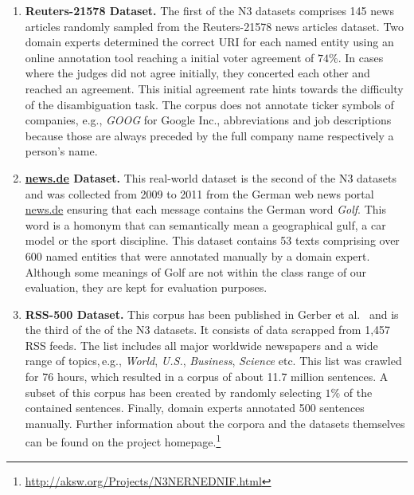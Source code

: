 \begin{enumerate}
\item \textbf{Reuters-21578 Dataset.}
The first of the N3 datasets comprises 145 news articles randomly sampled from the Reuters-21578 news articles dataset.
Two domain experts determined the correct URI for each named entity using an online annotation tool reaching a initial voter agreement of $74\%$.
In cases where the judges did not agree initially, they concerted each other and reached an agreement.
This initial agreement rate hints towards the difficulty of the disambiguation task.
The corpus does not annotate ticker symbols of companies, e.g., \textit{GOOG} for Google Inc., abbreviations and job descriptions because those are always preceded by the full company name respectively a person's name.

\item \textbf{\url{news.de} Dataset.}
This real-world dataset is the second of the N3 datasets and was collected from 2009 to 2011 from the German web news portal \url{news.de} ensuring that each message contains the German word \emph{Golf}.
This word is a homonym that can semantically mean a geographical gulf, a car model or the sport discipline.
This dataset contains 53 texts comprising over 600 named entities that were annotated manually by a domain expert.
Although some meanings of Golf are not within the class range of our evaluation, they are kept for evaluation purposes.

\item \textbf{RSS-500 Dataset.}
This corpus has been published in Gerber et al.~\cite{GER+13} and is the third of the of the N3 datasets.
It consists of data scrapped from 1,457 RSS feeds. %
The list includes all major worldwide newspapers and a wide range of topics,\,e.g., \emph{World}, \emph{U.S.}, \emph{Business}, \emph{Science} etc.
This list was crawled for 76 hours, which resulted in a corpus of about 11.7 million sentences.
A subset of this corpus has been created by randomly selecting $1\%$ of the contained sentences.
Finally, domain experts annotated 500 sentences manually. 
Further information about the corpora and the datasets themselves can be found on the project homepage.\footnote{\url{http://aksw.org/Projects/N3NERNEDNIF.html}}


\end{enumerate}
